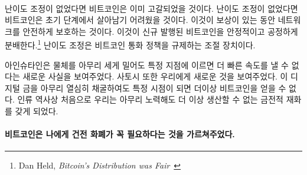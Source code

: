 \paragraph{}
\begin{comment}	
	If it weren't for this difficulty adjustment, all bitcoins would have been mined
	already. If it weren't for this difficulty adjustment, Bitcoin probably wouldn't
	have survived in its infancy. It is what secures the network in its reward era.
	It is what ensures a steady and fair distribution\footnote{Dan Held,
		\textit{Bitcoin's Distribution was Fair}~\cite{distribution-was-fair}} of new
	bitcoin. It is the thermostat which regulates Bitcoin's monetary policy.
\end{comment}
난이도 조정이 없었다면 비트코인은 이미 고갈되었을 것이다. 
난이도 조정이 없었다면 비트코인은 초기 단계에서 살아남기 어려웠을 것이다.
이것이 보상이 있는 동안 네트워크를 안전하게 보호하는 것이다.
이것이 신규 발행된 비트코인을 안정적이고 공정하게 분배한다.\footnote{Dan Held,
	\textit{Bitcoin’s Distribution was Fair}~\cite{distribution-was-fair}}
난이도 조정은 비트코인 통화 정책을 규제하는 조절 장치이다.

\begin{comment}	
	Einstein showed us something novel: no matter how hard you push an
	object, at a certain point you won't be able to get more speed out of
	it. Satoshi also showed us something novel: no matter how hard you dig
	for this digital gold, at a certain point you won't be able to get more
	bitcoin out of it. For the first time in human history, we have a
	monetary good which, no matter how hard you try, you won't be able to
	produce more of.
\end{comment}
아인슈타인은 물체를 아무리 세게 밀어도 특정 지점에 이르면 더 빠른 속도를 낼 수 없다는 새로운 사실을 보여주었다. 
사토시 또한 우리에게 새로운 것을 보여주었다. 
이 디지털 금을 아무리 열심히 채굴하여도 특정 시점이 되면 더이상 비트코인을 얻을 수 없다. 
인류 역사상 처음으로 우리는 아무리 노력해도 더 이상 생산할 수 없는 금전적 재화를 갖게 되었다.

\paragraph{비트코인은 나에게 건전 화폐가 꼭 필요하다는 것을 가르쳐주었다.}

